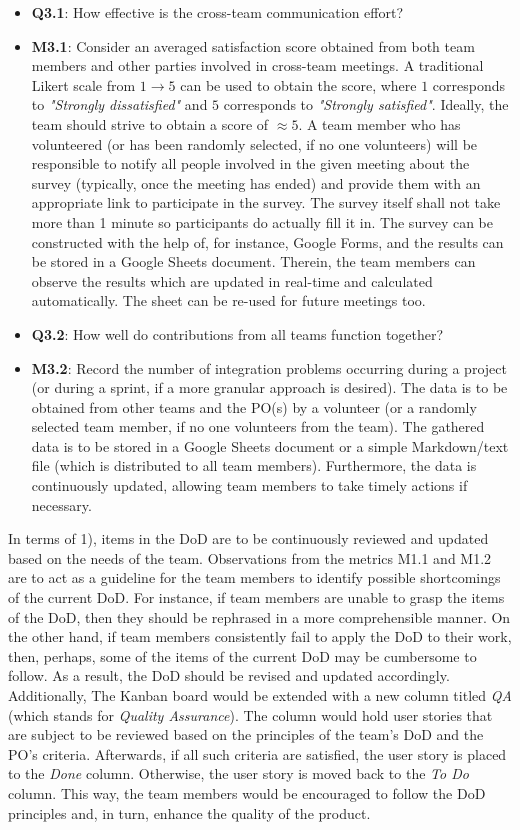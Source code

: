 \documentclass[conference]{IEEEtran}
\begin{document}
\begin{itemize}
  \item \textbf{Q3.1}: How effective is the cross-team communication effort?
  \item \textbf{M3.1}: Consider an averaged satisfaction score obtained from
    both team members and other parties involved in cross-team meetings. A
    traditional Likert scale from $1 \to 5$ can be used to obtain the score,
    where $1$ corresponds to \textit{"Strongly dissatisfied"} and $5$
    corresponds to \textit{"Strongly satisfied"}. Ideally, the team should
    strive to obtain a score of $\approx 5$. A team member who has volunteered
    (or has been randomly selected, if no one volunteers) will be responsible
    to notify all people involved in the given meeting about the survey
    (typically, once the meeting has ended) and provide them with an
    appropriate link to participate in the survey. The survey itself shall not
    take more than 1 minute so participants do actually fill it in. The survey
    can be constructed with the help of, for instance, Google Forms, and the
    results can be stored in a Google Sheets document. Therein, the team
    members can observe the results which are updated in real-time and
    calculated automatically. The sheet can be re-used for future meetings too.
  \item \textbf{Q3.2}: How well do contributions from all teams function together?
  \item \textbf{M3.2}: Record the number of integration problems occurring
    during a project (or during a sprint, if a more granular approach is
    desired). The data is to be obtained from other teams and the PO(s) by a
    volunteer (or a randomly selected team member, if no one volunteers from
    the team). The gathered data is to be stored in a Google Sheets document or
    a simple Markdown/text file (which is distributed to all team members).
    Furthermore, the data is continuously updated, allowing team members to
    take timely actions if necessary. 
\end{itemize}

In terms of 1), items in the DoD are to be continuously reviewed and updated
based on the needs of the team. Observations from the metrics M1.1 and M1.2 are
to act as a guideline for the team members to identify possible shortcomings of
the current DoD. For instance, if team members are unable to grasp the items of
the DoD, then they should be rephrased in a more comprehensible manner. On the
other hand, if team members consistently fail to apply the DoD to their work,
then, perhaps, some of the items of the current DoD may be cumbersome to
follow. As a result, the DoD should be revised and updated accordingly.
Additionally, The Kanban board would be extended with a new column titled
\textit{QA} (which stands for \textit{Quality Assurance}). The column would
hold user stories that are subject to be reviewed based on the principles of
the team's DoD and the PO's criteria. Afterwards, if all such criteria are
satisfied, the user story is placed to the \textit{Done} column. Otherwise, the
user story is moved back to the \textit{To Do} column. This way, the team
members would be encouraged to follow the DoD principles and, in turn, enhance
the quality of the product.
\end{document}
